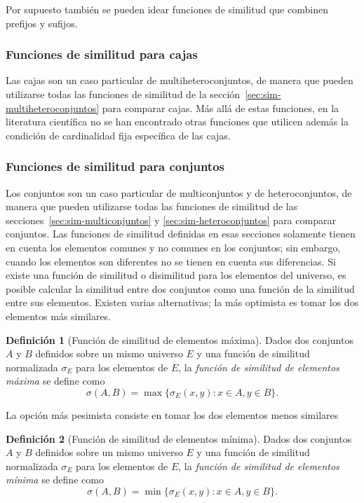 \documentclass[a4paper,10pt,twoside]{article}
\theoremstyle{definition}
\newtheorem{definition}{Definición}
\begin{document}
Por supuesto también se pueden idear funciones de similitud que combinen prefijos y sufijos. 


\subsubsection{Funciones de similitud para cajas}
\label{sec:sim-cajas}
Las cajas son un caso particular de multiheteroconjuntos, de manera que
pueden utilizarse todas las funciones de similitud de la sección~\ref{sec:sim-multiheteroconjuntos} para comparar cajas.
Más allá de estas funciones, en la literatura científica no se han encontrado otras funciones que utilicen además la condición de cardinalidad fija específica de las cajas. 


\subsubsection{Funciones de similitud para conjuntos}
\label{sec:sim-conjuntos}

Los conjuntos son un caso particular de multiconjuntos y de
heteroconjuntos, de manera que pueden utilizarse todas las funciones de similitud de las secciones~\ref{sec:sim-multiconjuntos} y \ref{sec:sim-heteroconjuntos} para comparar conjuntos.
Las funciones de similitud definidas en esas secciones solamente tienen en cuenta los elementos comunes y no comunes en los conjuntos; sin embargo, cuando los elementos son diferentes no se tienen en cuenta sus diferencias.
Si existe una función de similitud o disimilitud para los elementos del universo, es posible calcular la similitud entre dos conjuntos como una función de la similitud entre sus elementos.
Existen varias alternativas; la más optimista es tomar los dos elementos más similares.

\begin{definition}[Función de similitud de elementos máxima]
Dados dos conjuntos $A$ y $B$ definidos sobre un mismo universo $E$ y una función de similitud normalizada $\sigma_E$ para los elementos de $E$, la \emph{función de similitud de elementos máxima} se define como
\[
\sigma(A,B)=\max\{\sigma_E(x,y): x\in A, y\in B\}.
\]
\end{definition}

La opción más pesimista consiste en tomar los dos elementos menos similares

\begin{definition}[Función de similitud de elementos mínima]
Dados dos conjuntos $A$ y $B$ definidos sobre un mismo universo $E$ y una función de similitud normalizada $\sigma_E$ para los elementos de $E$, la \emph{función de similitud de elementos mínima} se define como
\[
\sigma(A,B)=\min\{\sigma_E(x,y): x\in A, y\in B\}.
\]
\end{definition}
\end{document}
